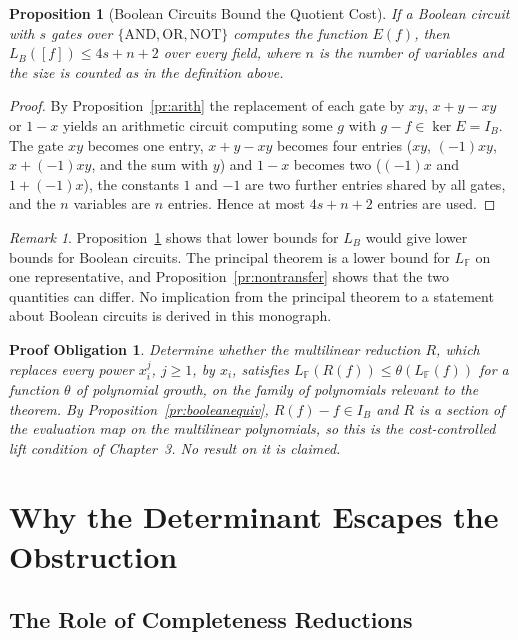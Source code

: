 \documentclass[11pt,letterpaper]{report}
\theoremstyle{plain}
\newtheorem{proposition}[theorem]{Proposition}
\newtheorem{obligation}[theorem]{Proof Obligation}
\theoremstyle{definition}
\theoremstyle{remark}
\newtheorem{remark}[theorem]{Remark}
\begin{document}
\begin{proposition}[Boolean Circuits Bound the Quotient Cost]\label{pr:boolbound}
If a Boolean circuit with $s$ gates over $\{\mathrm{AND},\mathrm{OR},\mathrm{NOT}\}$ computes the function $E(f)$, then $L_B([f])\le4s+n+2$ over every field, where $n$ is the number of variables and the size is counted as in the definition above.
\end{proposition}
\begin{proof}
By Proposition~\ref{pr:arith} the replacement of each gate by $xy$, $x+y-xy$ or $1-x$ yields an arithmetic circuit computing some $g$ with $g-f\in\ker E=I_B$. The gate $xy$ becomes one entry, $x+y-xy$ becomes four entries ($xy$, $(-1)xy$, $x+(-1)xy$, and the sum with $y$) and $1-x$ becomes two ($(-1)x$ and $1+(-1)x$), the constants $1$ and $-1$ are two further entries shared by all gates, and the $n$ variables are $n$ entries. Hence at most $4s+n+2$ entries are used.
\end{proof}

\begin{remark}
Proposition~\ref{pr:boolbound} shows that lower bounds for $L_B$ would give lower bounds for Boolean circuits. The principal theorem is a lower bound for $L_{\mathbb F}$ on one representative, and Proposition~\ref{pr:nontransfer} shows that the two quantities can differ. No implication from the principal theorem to a statement about Boolean circuits is derived in this monograph.
\end{remark}

\begin{obligation}\label{ob:lift}
Determine whether the multilinear reduction $R$, which replaces every power $x_i^j$, $j\ge1$, by $x_i$, satisfies $L_{\mathbb F}(R(f))\le\theta(L_{\mathbb F}(f))$ for a function $\theta$ of polynomial growth, on the family of polynomials relevant to the theorem. By Proposition~\ref{pr:booleanequiv}, $R(f)-f\in I_B$ and $R$ is a section of the evaluation map on the multilinear polynomials, so this is the cost-controlled lift condition of Chapter~3. No result on it is claimed.
\end{obligation}

\chapter{Why the Determinant Escapes the Obstruction}

\section{The Role of Completeness Reductions}
\end{document}
